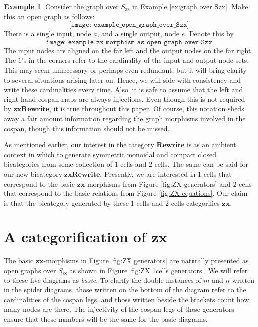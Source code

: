 \documentclass[11pt]{amsart}
\theoremstyle{definition}
\newtheorem{ex}[thm]{Example}
\begin{document}
\begin{ex}
\label{ex:open graph over Szx}
Consider the graph over $S_{\text{zx}}$ in Example \ref{ex:graph over Szx}.  Make this an open graph as follows:
\[
	\texttt{[image: example\_open\_graph\_over\_Szx]}
\]
There is a single input, node $a$, and a single output, node $e$. Denote this by
\[
\texttt{[image: example\_zx\_morphism\_as\_open\_graph\_over\_Szx]}
\]
The input nodes are aligned on the far left and the output nodes on the far right.  The $1$'s in the corners refer to the cardinality of the input and output node sets.  This may seem unnecessary or perhaps even redundant, but it will bring clarity to several situations arising later on. Hence, we will side with consistency and write these cardinalities every time.  Also, it is safe to assume that the left and right hand cospan maps are always injections. Even though this is not required by $\mathbf{zxRewrite}$, it is true throughout this paper.  Of course, this notation sheds away a fair amount information regarding the graph morphisms involved in the cospan, though this information should not be missed.
\end{ex}

As mentioned earlier, our interest in the category $\mathbf{Rewrite}$ is as an ambient context in which to generate symmetric monoidal and compact closed bicategories from some collection of $1$-cells and $2$-cells. The same can be said for our new bicategory $\mathbf{zxRewrite}$.  Presently, we are interested in $1$-cells that correspond to the basic $\mathbf{zx}$-morphisms from Figure \ref{fig:ZX generators} and $2$-cells that correspond to the basic relations from Figure \ref{fig:ZX equations}.  Our claim is that the bicategory generated by these $1$-cells and $2$-cells categorifies $\mathbf{zx}$.

\section{A categorification of $\mathbf{zx}$}
\label{sec:zx categorified}

The basic $\mathbf{zx}$-morphisms in Figure \ref{fig:ZX generators} are naturally presented as open graphs over $S_{\text{zx}}$ as shown in Figure \ref{fig:ZX 1cells generators}.  We will refer to these five diagrams as \emph{basic}.  To clarify the double instances of $m$ and $n$ written in the spider diagrams, those written on the bottom of the diagram refer to the cardinalities of the cospan legs, and those written beside the brackets count how many nodes are there.  The injectivity of the cospan legs of these generators ensure that these numbers will be the same for the basic diagrams.
\end{document}
